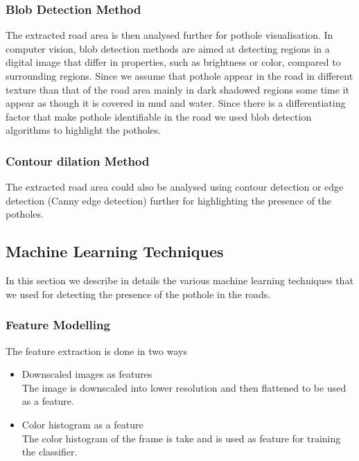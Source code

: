 \documentclass[journal]{IEEEtran}
\begin{document}
\newpage

\subsubsection{Blob Detection Method}

The extracted road area is then analysed further for pothole visualisation. In computer vision, blob detection methods are aimed at detecting regions in a digital image that differ in properties, such as brightness or color, compared to surrounding regions. Since we assume that pothole appear in the road in different texture than that of the road area mainly in dark shadowed regions some time it appear as though it is covered in mud and water. Since there is a differentiating factor that make pothole identifiable in the road we used blob detection algorithms to highlight the potholes.

\subsubsection{Contour dilation Method}
The extracted road area could also be analysed using contour detection or edge detection (Canny edge detection) further for highlighting the presence of the potholes.

\subsection{Machine Learning Techniques}

In this section we describe in details the various machine learning techniques that we used for detecting the presence of the pothole in the roads.

\subsubsection{Feature Modelling}

The feature extraction is done in two ways 
\begin{itemize}
\item Downscaled images as features \\
The image is downscaled into lower resolution and then flattened to be used as a feature.
\item Color histogram as a feature \\
The color histogram of the frame is take and is used as feature for training the classifier.
\end{itemize}
\end{document}
